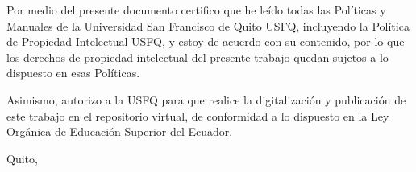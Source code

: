\clearpage
\blank
{}
\begingroup\dobleesp\setlength{\parindent}{0.5in}
\vspace{6pt}
Por medio del presente documento certifico que he leído todas las Políticas y Manuales de la Universidad San Francisco de Quito USFQ, incluyendo la Política de Propiedad Intelectual USFQ, y estoy de acuerdo con su contenido, por lo que los derechos de propiedad intelectual del presente trabajo quedan sujetos a lo dispuesto en esas Políticas.
\par\vspace{6pt}
Asimismo, autorizo a la USFQ para que realice la digitalización y publicación de este trabajo en el repositorio virtual, de conformidad a lo dispuesto en la Ley Orgánica de Educación Superior del Ecuador.
\par
\endgroup
\blank\blank\blank\blank\blank\blank\blank\blank
{}\nombreAutor\par
\blank\blank
{}\codigoEstudiante\par
\blank\blank
{}\cedulaIdentidad\par
\blank\blank
{}Quito, \fechaDocumento\par
